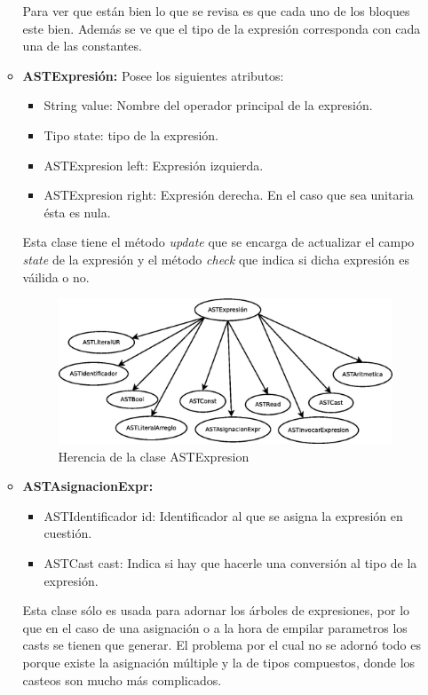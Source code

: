 \documentclass[11pt, spanish]{report}
\begin{document}
\begin{itemize}
\begin{itemize}
    Para ver que est\'an bien lo que se revisa es que cada uno de los bloques este bien. Adem\'as se ve que el tipo de la expresi\'on corresponda con cada una de las constantes.

  \item \textbf{ASTExpresi\'on:}    
    Posee los siguientes atributos:
    \begin{itemize}
    \item String value: Nombre del operador principal de la expresi\'on.
    \item Tipo state: tipo de la expresi\'on.
    \item ASTExpresion left: Expresi\'on izquierda.
    \item ASTExpresion right: Expresi\'on derecha.  En el caso que sea unitaria \'esta es nula.
    \end{itemize}

    Esta clase tiene el m\'etodo \emph{update} que se encarga de actualizar el campo \emph{state} de la expresi\'on y el m\'etodo \emph{check} que indica si dicha expresi\'on
    es v\'ailida o no.

    \begin{figure}[htp]
      \centering
      \mbox{\includegraphics[scale=0.4]{expresiones.jpg}}
      \caption{Herencia de la clase ASTExpresion}
      \label{fig expresion}
    \end{figure}
    
  \item \textbf{ASTAsignacionExpr:}
    \begin{itemize}
    \item ASTIdentificador id: Identificador al que se asigna la expresi\'on en cuesti\'on.
    \item ASTCast cast: Indica si hay que hacerle una conversi\'on al tipo de la expresi\'on.
    \end{itemize}

    Esta clase s\'olo es usada para adornar los \'arboles de expresiones, por lo que en el caso de una asignaci\'on o a la hora de empilar parametros los casts se tienen que generar. El problema por el cual no se adorn\'o todo es porque existe la asignaci\'on m\'ultiple y la de tipos compuestos, donde los casteos son mucho m\'as complicados.


\end{itemize}
\end{itemize}
\end{document}
